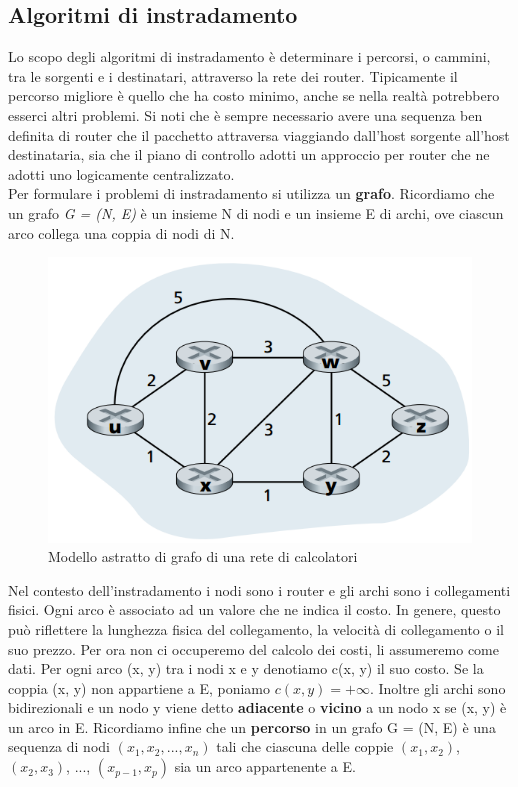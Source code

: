 \documentclass[11pt,a4paper]{article}
\begin{document}
\subsection{Algoritmi di instradamento}
Lo scopo degli algoritmi di instradamento è determinare i percorsi, o cammini, tra le sorgenti e i destinatari, attraverso la rete dei router. Tipicamente il percorso migliore è quello che ha costo minimo, anche se nella realtà potrebbero esserci altri problemi. Si noti che è sempre necessario avere una sequenza ben definita di router che il pacchetto attraversa viaggiando dall'host sorgente all'host destinataria, sia che il piano di controllo adotti un approccio per router che ne adotti uno logicamente centralizzato. \\
Per formulare i problemi di instradamento si utilizza un \textbf{grafo}. Ricordiamo che un grafo \textit{G = (N, E)} è un insieme N di nodi e un insieme E di archi, ove ciascun arco collega una coppia di nodi di N.
\begin{figure}
	\includegraphics[scale=0.7]{img/059.png}
	\caption{Modello astratto di grafo di una rete di calcolatori}
	\label{fig: 059}
\end{figure}
Nel contesto dell'instradamento i nodi sono i router e gli archi sono i collegamenti fisici. Ogni arco è associato ad un valore che ne indica il costo. In genere, questo può riflettere la lunghezza fisica del collegamento, la velocità di collegamento o il suo prezzo. Per ora non ci occuperemo del calcolo dei costi, li assumeremo come dati. Per ogni arco (x, y) tra i nodi x e y denotiamo c(x, y) il suo costo. Se la coppia (x, y) non appartiene a E, poniamo $c(x, y) = +\infty$. Inoltre gli archi sono bidirezionali e un nodo y viene detto \textbf{adiacente} o \textbf{vicino} a un nodo x se (x, y) è un arco in E. Ricordiamo infine che un \textbf{percorso} in un grafo G = (N, E) è una sequenza di nodi $(x_{1}, x_{2}, ..., x_{n})$ tali che ciascuna delle coppie $(x_{1}, x_{2})$, $(x_{2}, x_{3})$, ..., $(x_{p-1}, x_{p})$ sia un arco appartenente a E.\\
\end{document}
